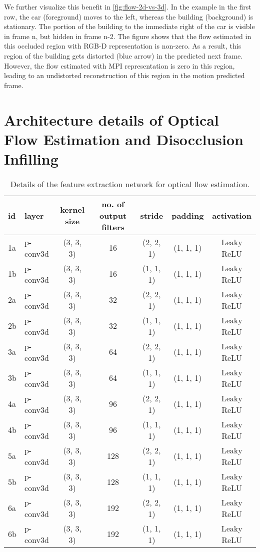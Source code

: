 \documentclass[preprint]{vgtc}
\begin{document}
    We further visualize this benefit in \autoref{fig:flow-2d-vs-3d}.
    In the example in the first row, the car (foreground) moves to the left, whereas the building (background) is stationary.
    The portion of the building to the immediate right of the car is visible in frame n, but hidden in frame n-2.
    The figure shows that the flow estimated in this occluded region with RGB-D representation is non-zero.
    As a result, this region of the building gets distorted (blue arrow) in the predicted next frame.
    However, the flow estimated with MPI representation is zero in this region, leading to an undistorted reconstruction of this region in the motion predicted frame.


    \section{Architecture details of Optical Flow Estimation and Disocclusion Infilling}\label{sec:flow-math}
    \begin{table*}
        \centering
        \begin{tabular}{l|lccccc}
            \hline
            \textbf{id} & \textbf{layer} & \textbf{kernel size} & \textbf{no. of output filters} & \textbf{stride} & \textbf{padding} & \textbf{activation} \\
            \hline
            1a & p-conv3d & (3, 3, 3) & 16 & (2, 2, 1) & (1, 1, 1) & Leaky ReLU \\
            1b & p-conv3d & (3, 3, 3) & 16 & (1, 1, 1) & (1, 1, 1) & Leaky ReLU \\
            2a & p-conv3d & (3, 3, 3) & 32 & (2, 2, 1) & (1, 1, 1) & Leaky ReLU \\
            2b & p-conv3d & (3, 3, 3) & 32 & (1, 1, 1) & (1, 1, 1) & Leaky ReLU \\
            3a & p-conv3d & (3, 3, 3) & 64 & (2, 2, 1) & (1, 1, 1) & Leaky ReLU \\
            3b & p-conv3d & (3, 3, 3) & 64 & (1, 1, 1) & (1, 1, 1) & Leaky ReLU \\
            4a & p-conv3d & (3, 3, 3) & 96 & (2, 2, 1) & (1, 1, 1) & Leaky ReLU \\
            4b & p-conv3d & (3, 3, 3) & 96 & (1, 1, 1) & (1, 1, 1) & Leaky ReLU \\
            5a & p-conv3d & (3, 3, 3) & 128 & (2, 2, 1) & (1, 1, 1) & Leaky ReLU \\
            5b & p-conv3d & (3, 3, 3) & 128 & (1, 1, 1) & (1, 1, 1) & Leaky ReLU \\
            6a & p-conv3d & (3, 3, 3) & 192 & (2, 2, 1) & (1, 1, 1) & Leaky ReLU \\
            6b & p-conv3d & (3, 3, 3) & 192 & (1, 1, 1) & (1, 1, 1) & Leaky ReLU \\
            \hline
        \end{tabular}
        \caption{Details of the feature extraction network for optical flow estimation.}
        \label{tab:pwc-feature-extraction}
    \end{table*}
\end{document}
